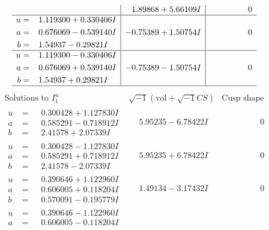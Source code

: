 \documentclass[1p]{elsarticle_modified}
\theoremstyle{definition}
\newcommand{\I}{\sqrt{-1}}
\begin{document}
$$\begin{array}{c|c|c}
 & \phantom{-}1.89868 + 5.66109 I & \phantom{-0.000000 } 0 \\ \hline\begin{aligned}
u &= \phantom{-}1.119300 + 0.330406 I \\
a &= \phantom{-}0.676069 - 0.539140 I \\
b &= \phantom{-}1.54937 - 0.29821 I\end{aligned}
 & -0.75389 + 1.50754 I & \phantom{-0.000000 } 0 \\ \hline\begin{aligned}
u &= \phantom{-}1.119300 - 0.330406 I \\
a &= \phantom{-}0.676069 + 0.539140 I \\
b &= \phantom{-}1.54937 + 0.29821 I\end{aligned}
 & -0.75389 - 1.50754 I & \phantom{-0.000000 } 0\\
 \hline 
 \end{array}$$\newpage$$\begin{array}{c|c|c}  
\text{Solutions to }I^u_{1}& \I (\text{vol} + \sqrt{-1}CS) & \text{Cusp shape}\\
 \hline 
\begin{aligned}
u &= \phantom{-}0.300428 + 1.127830 I \\
a &= \phantom{-}0.585291 - 0.718912 I \\
b &= \phantom{-}2.41578 + 2.07339 I\end{aligned}
 & \phantom{-}5.95235 - 6.78422 I & \phantom{-0.000000 } 0 \\ \hline\begin{aligned}
u &= \phantom{-}0.300428 - 1.127830 I \\
a &= \phantom{-}0.585291 + 0.718912 I \\
b &= \phantom{-}2.41578 - 2.07339 I\end{aligned}
 & \phantom{-}5.95235 + 6.78422 I & \phantom{-0.000000 } 0 \\ \hline\begin{aligned}
u &= \phantom{-}0.390646 + 1.122960 I \\
a &= \phantom{-}0.606005 + 0.118204 I \\
b &= \phantom{-}0.570091 - 0.195779 I\end{aligned}
 & \phantom{-}1.49134 - 3.17432 I & \phantom{-0.000000 } 0 \\ \hline\begin{aligned}
u &= \phantom{-}0.390646 - 1.122960 I \\
a &= \phantom{-}0.606005 - 0.118204 I \\

\end{aligned}
\end{array}$$
\end{document}
